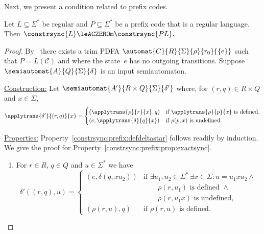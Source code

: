 Next, we present a condition related to prefix codes.

\begin{theorem}
	\label{constr_sync:thm:prefix_before}
	\label{constr_sync:thm:in_font}
	Let $L \subseteq \Sigma^*$ be regular 
	and $P \subseteq \Sigma^*$ be a prefix code that is a regular language. 
	Then 
	$
	\constrsync{L} \leACZEROm \constrsync{PL}.
	$	
\end{theorem}
\begin{proof}    	
	By~ 
	there exists a trim PDFA
	$\automat{C}{R}{\Sigma}{\rho}{r_0}{\{e\}}$
	such that $P = L(\mathcal C)$
	and where the state~$e$ has no outgoing transitions.
	Suppose $\semiautomat{A}{Q}{\Sigma}{\delta}$ is an input semiautomaton. 
	
	
	\medskip 	
	\noindent\underline{Construction:} Let $\semiautomat{A'}{R \times Q}{\Sigma}{\delta'}$
	where, for $(r,q) \in R \times Q$ and $x \in \Sigma$,
	\[
	\applytrans{\delta'}{(r, q)}{x} = \begin{cases}
		(\applytrans{\rho}{r}{x}, q)   & \text{if } \applytrans{\rho}{p}{x} \text{ is defined,} \\
		(e, \applytrans{\delta}{q}{x}) & \text{if } \rho(p, x) \text{ is undefined. }
	\end{cases} 
	\]
	
	
	
	\medskip 	
	\noindent\underline{Properties:} Property~\ref{constrsync:prefix:defdeltastar} follows readily by induction.
	We give the proof for Property~\ref{constrsync:prefix:prop:exactsync}.
	\begin{enumerate}    	
		
		\item \label{constrsync:prefix:defdeltastar} For $r \in R$, $q \in Q$ and $u \in \Sigma^*$ we have
		\begin{equation}\label{constrsync:prefix:eqn:transitionword}
			\delta'((r, q), u)
		=
		\begin{cases}
		(e, \delta(q, xu_2)) & \text{if } \exists u_1, u_2 \in \Sigma^* \ \exists x \in \Sigma \colon u = u_1 x u_2 \land \\ 
		                    & \qquad \rho(r, u_1) \text{ is defined } \land \\ 
		                    & \qquad \rho(r, u_1 x) \text{ is undefined}, \\
		(\rho(r, u), q)     & \text{if } \rho(r, u) \text{ is defined. } 
		\end{cases}
		\end{equation}
				

\end{enumerate}
\end{proof}
